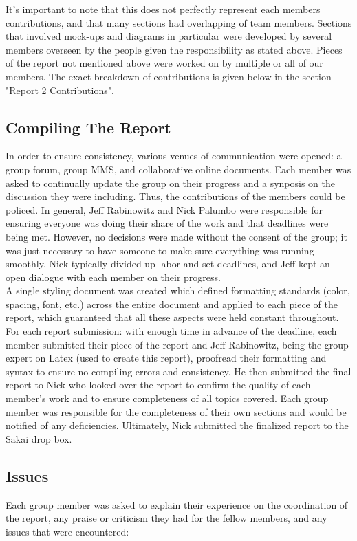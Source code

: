 It's important to note that this does not perfectly represent each members contributions, and that many sections had overlapping of team members. Sections that involved mock-ups and diagrams in particular were developed by several members overseen by the people given the responsibility as stated above. Pieces of the report not mentioned above were worked on by multiple or all of our members. The exact breakdown of contributions is given below in the section "Report 2 Contributions". \\

\subsection{Compiling The Report}
In order to ensure consistency, various venues of communication were opened: a group forum, group MMS, and collaborative online documents. Each member was asked to continually update the group on their progress and a synposis on the discussion they were including. Thus, the contributions of the members could be policed. In general, Jeff Rabinowitz and Nick Palumbo were responsible for ensuring everyone was doing their share of the work and that deadlines were being met. However, no decisions were made without the consent of the group; it was just necessary to have someone to make sure everything was running smoothly. Nick typically divided up labor and set deadlines, and Jeff kept an open dialogue with each member on their progress. \\

A single styling document was created which defined formatting standards (color, spacing, font, etc.) across the entire document and applied to each piece of the report, which guaranteed that all these aspects were held constant throughout. For each report submission: with enough time in advance of the deadline, each member submitted their piece of the report and Jeff Rabinowitz, being the group expert on Latex (used to create this report), proofread their formatting and syntax to ensure no compiling errors and consistency. He then submitted the final report to Nick who looked over the report to confirm the quality of each member's work and to ensure completeness of all topics covered. Each group member was responsible for the completeness of their own sections and would be notified of any deficiencies. Ultimately, Nick submitted the finalized report to the Sakai drop box. \\

\subsection{Issues}
Each group member was asked to explain their experience on the coordination of the report, any praise or criticism they had for the fellow members, and any issues that were encountered:

